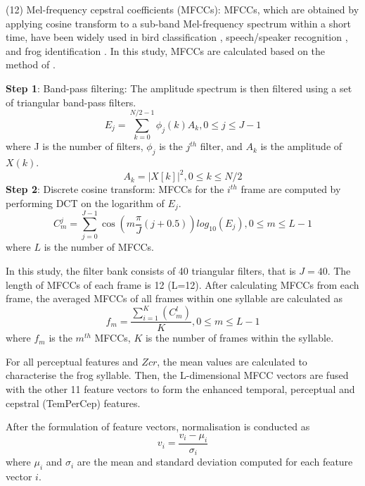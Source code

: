 \vspace{3mm}

\noindent(12) Mel-frequency cepstral coefficients (MFCCs): MFCCs, which are obtained by applying cosine transform to a sub-band Mel-frequency spectrum within a short time, have been widely used in bird classification \citep{lee2006automatic}, speech/speaker recognition \citep{han2006efficient}, and frog identification \citep{bedoya2014automatic}. In this study, MFCCs are calculated based on the method of \citep{lee2006automatic}. 

\noindent  \textbf{Step 1}: Band-pass filtering: The amplitude spectrum is then filtered using a set of triangular band-pass filters.
\begin{equation}
E_{j}=\sum_{k=0}^{N/2-1}\phi_{j}(k)A_{k}, 0 \leq j \leq J-1
\end{equation}
where J is the number of filters, $\phi_{j}$ is the $j^{th}$ filter, and $A_{k}$ is the amplitude of $X(k)$.
\begin{equation}
A_{k}=|X[k]|^{2}, 0 \leq k \leq N/2
\end{equation}
\noindent  \textbf{Step 2}: Discrete cosine transform: MFCCs for the $i^{th}$ frame are computed by performing DCT on the logarithm of $E_{j}$. 
\begin{equation}
C_{m}^{j} = \sum_{j=0}^{J-1}\cos(m \frac{\pi}{J}(j+0.5))log_{10}(E_{j}), 0 \leq m \leq L-1
\end{equation}
where $L$ is the number of MFCCs.

In this study, the filter bank consists of 40 triangular filters, that is  $J=40$. The length of MFCCs of each frame is 12 (L=12). After calculating MFCCs from each frame, the averaged MFCCs of all frames within one syllable are calculated as
\begin{equation}
f_{m}= \frac{\sum_{i=1}^{K}(C_{m}^{l})}{K}, 0\leq m \leq L-1
\end{equation}
where $f_{m}$ is the $m^{th}$ MFCCs, $K$ is the number of frames within the syllable. 

For all perceptual features and $Zcr$, the mean values are calculated to characterise the frog syllable. Then, the L-dimensional MFCC vectors are fused with the other 11 feature vectors to form the enhanced temporal, perceptual and cepstral (TemPerCep) features.

After the formulation of feature vectors, normalisation is conducted as 
\begin{equation}
v_{i} = \frac{v_{i}-\mu_{i}}{\sigma_{i}}
\end{equation} 
where $\mu_{i}$ and $\sigma_{i}$ are the mean and standard deviation computed for each feature vector $i$.  

